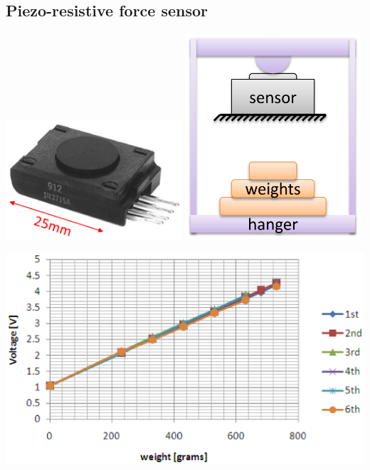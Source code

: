 \documentclass[11pt]{article}
\begin{document}
\subsection{Piezo-resistive force sensor}
\label{sec:org230f95b}
\begin{center}
\includegraphics[width=0.49\textwidth]{./images/honeywell-fs01-piezoresistive-force-sensor.png}
\includegraphics[width=0.49\textwidth]{./images/piezoresistive-force-sensor-working-principle.png}
\end{center}

\begin{center}
\includegraphics[width=.9\linewidth]{./images/piezoresistive-force-sensor-calibration-curve.png}
\end{center}
\end{document}
